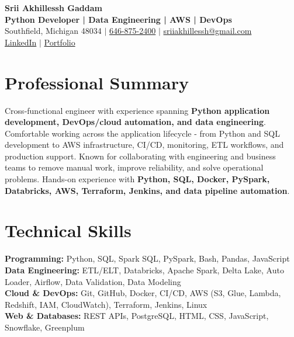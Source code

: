 \documentclass[letterpaper,10pt]{article}
\begin{document}
\fontsize{9.35pt}{10.45pt}\selectfont

\begin{center}
    {\LARGE \textbf{Srii Akhillessh Gaddam}} \\[-1pt]
    \textbf{Python Developer | Data Engineering | AWS | DevOps} \\[2pt]
    Southfield, Michigan 48034 $|$
    \href{tel:6468752400}{646-875-2400} $|$
    \href{mailto:sriiakhillessh@gmail.com}{sriiakhillessh@gmail.com} \\[1pt]
    \href{https://www.linkedin.com/in/srii-akhiilessh-gaddam-b48668191/}{LinkedIn} $|$
    \href{https://sriiakhillesshg.github.io/portfolio/}{Portfolio}
\end{center}
\vspace{-8pt}

\section{Professional Summary}
\small{Cross-functional engineer with experience spanning \textbf{Python application development, DevOps/cloud automation, and data engineering}. Comfortable working across the application lifecycle - from Python and SQL development to AWS infrastructure, CI/CD, monitoring, ETL workflows, and production support. Known for collaborating with engineering and business teams to remove manual work, improve reliability, and solve operational problems. Hands-on experience with \textbf{Python, SQL, Docker, PySpark, Databricks, AWS, Terraform, Jenkins, and data pipeline automation}.}

\section{Technical Skills}
\small{
\textbf{Programming:} Python, SQL, Spark SQL, PySpark, Bash, Pandas, JavaScript \\
\textbf{Data Engineering:} ETL/ELT, Databricks, Apache Spark, Delta Lake, Auto Loader, Airflow, Data Validation, Data Modeling \\
\textbf{Cloud \& DevOps:} Git, GitHub, Docker, CI/CD, AWS (S3, Glue, Lambda, Redshift, IAM, CloudWatch), Terraform, Jenkins, Linux \\
\textbf{Web \& Databases:} REST APIs, PostgreSQL, HTML, CSS, JavaScript, Snowflake, Greenplum
}
\end{document}
